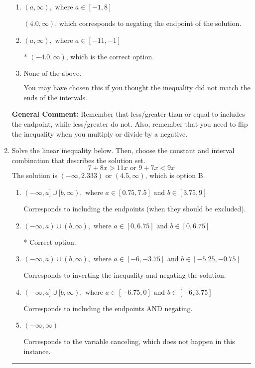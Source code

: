 \documentclass{extbook}[14pt]
\newcommand{\litem}[1]{\item #1

\rule{\textwidth}{0.4pt}}
\begin{document}
\begin{enumerate}
{\begin{enumerate}[label=\Alph*.]
 $(-\infty, 4.0)$, which corresponds to switching the direction of the interval AND negating the endpoint. You likely did this if you did not flip the inequality when dividing by a negative as well as not moving values over to a side properly.
\item \( (a, \infty), \text{ where } a \in [-1, 8] \)

 $(4.0, \infty)$, which corresponds to negating the endpoint of the solution.
\item \( (a, \infty), \text{ where } a \in [-11, -1] \)

* $(-4.0, \infty)$, which is the correct option.
\item \( \text{None of the above}. \)

You may have chosen this if you thought the inequality did not match the ends of the intervals.
\end{enumerate}

\textbf{General Comment:} Remember that less/greater than or equal to includes the endpoint, while less/greater do not. Also, remember that you need to flip the inequality when you multiply or divide by a negative.
}
\litem{
Solve the linear inequality below. Then, choose the constant and interval combination that describes the solution set.
\[ 7 + 8 x > 11 x \text{ or } 9 + 7 x < 9 x \]The solution is \( (-\infty, 2.333) \text{ or } (4.5, \infty) \), which is option B.\begin{enumerate}[label=\Alph*.]
\item \( (-\infty, a] \cup [b, \infty), \text{ where } a \in [0.75, 7.5] \text{ and } b \in [3.75, 9] \)

Corresponds to including the endpoints (when they should be excluded).
\item \( (-\infty, a) \cup (b, \infty), \text{ where } a \in [0, 6.75] \text{ and } b \in [0, 6.75] \)

 * Correct option.
\item \( (-\infty, a) \cup (b, \infty), \text{ where } a \in [-6, -3.75] \text{ and } b \in [-5.25, -0.75] \)

Corresponds to inverting the inequality and negating the solution.
\item \( (-\infty, a] \cup [b, \infty), \text{ where } a \in [-6.75, 0] \text{ and } b \in [-6, 3.75] \)

Corresponds to including the endpoints AND negating.
\item \( (-\infty, \infty) \)

Corresponds to the variable canceling, which does not happen in this instance.
\end{enumerate}

}
\end{enumerate}
\end{document}
